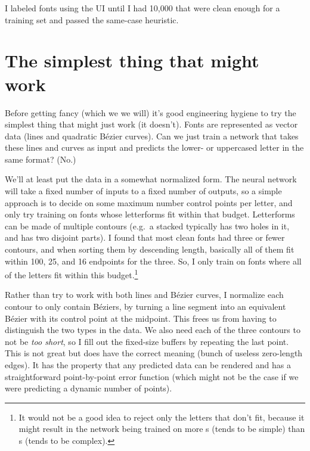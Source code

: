 \documentclass[twocolumn]{article}
\begin{document}
\medskip

I labeled fonts using the UI until I had 10,000 that were clean enough
for a training set and passed the same-case heuristic.

\section{The simplest thing that might work} \label{sec:vectorversion}

Before getting fancy (which we we will) it's good engineering hygiene
to try the simplest thing that might just work (it doesn't). Fonts
are represented as vector data (lines and quadratic B\'ezier curves).
Can we just train a network that takes these lines and curves as input
and predicts the lower- or uppercased letter in the same format? (No.)

We'll at least put the data in a somewhat normalized form. The neural
network will take a fixed number of inputs to a fixed number of
outputs, so a simple approach is to decide on some maximum number
control points per letter, and only try training on fonts whose
letterforms fit within that budget. Letterforms can be made of
multiple contours (e.g.~a stacked  typically has two
holes in it, and  has two disjoint parts). I found that
most clean fonts had three or fewer contours, and when sorting them by
descending length, basically all of them fit within 100, 25, and 16
endpoints for the three. So, I only train on fonts where all of the
letters fit within this budget.\footnote{It would not be a good idea
  to reject only the letters that don't fit, because it might result
  in the network being trained on more s (tends to be
  simple) than s (tends to be complex).}


Rather than try to work with both lines and B\'ezier curves, I
normalize each contour to only contain B\'eziers, by turning a line
segment into an equivalent B\'ezier with its control point at the
midpoint. This frees us from having to distinguish the two types in
the data. We also need each of the three contours to not be {\em too
  short}, so I fill out the fixed-size buffers by repeating the last
point. This is not great but does have the correct meaning (bunch of
useless zero-length edges). It has the property that any predicted
data can be rendered and has a straightforward point-by-point error
function (which might not be the case if we were predicting a dynamic
number of points).
\end{document}
